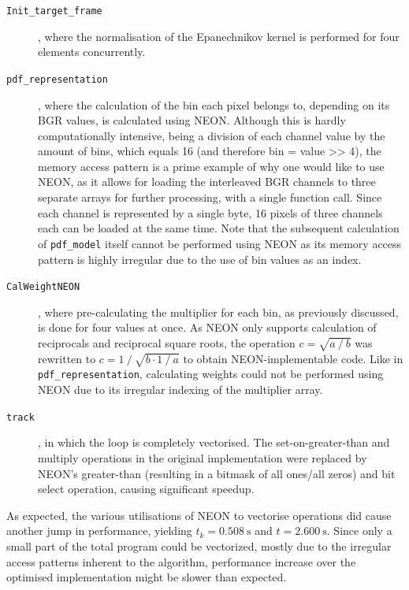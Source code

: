\documentclass[final]{article}
\begin{document}
\begin{description}
    \item[\texttt{Init\_target\_frame}], where the normalisation of the Epanechnikov kernel is performed for four elements concurrently.

    \item[\texttt{pdf\_representation}], where the calculation of the bin each pixel belongs to, depending on its BGR values, is calculated using NEON. Although this is hardly computationally intensive, being a division of each channel value by the amount of bins, which equals 16 (and therefore bin = value >> 4), the memory access pattern is a prime example of why one would like to use NEON, as it allows for loading the interleaved BGR channels to three separate arrays for further processing, with a single function call. Since each channel is represented by a single byte, 16 pixels of three channels each can be loaded at the same time.
    Note that the subsequent calculation of \texttt{pdf\_model} itself cannot be performed using NEON as its memory access pattern is highly irregular due to the use of bin values as an index.

    \item[\texttt{CalWeightNEON}], where pre-calculating the multiplier for each bin, as previously discussed, is done for four values at once. As NEON only supports calculation of reciprocals and reciprocal square roots, the operation $c = \sqrt{a \mathbin{/} b}$ was rewritten to $c = 1 \mathbin{/} \sqrt{b \cdot 1 \mathbin{/} a}$ to obtain NEON-implementable code. Like in \texttt{pdf\_representation}, calculating weights could not be performed using NEON due to its irregular indexing of the multiplier array.

    \item[\texttt{track}], in which the loop is completely vectorised. The set-on-greater-than and multiply operations in the original implementation were replaced by NEON's greater-than (resulting in a bitmask of all ones/all zeros) and bit select operation, causing significant speedup.
\end{description}

As expected, the various utilisations of NEON to vectorise operations did cause another jump in performance, yielding $t_k = \SI{0.508}{\second}$ and $t = \SI{2.600}{\second}$. Since only a small part of the total program could be vectorized, mostly due to the irregular access patterns inherent to the algorithm, performance increase over the optimised implementation might be slower than expected.
\end{document}
